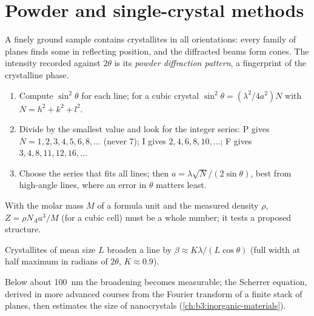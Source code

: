 \section{Powder and single-crystal methods}

\begin{definition}\label{def:b3:x-ray-diffraction:powder}
A finely ground sample contains crystallites in all orientations: every
family of planes finds some in reflecting position, and the diffracted beams
form cones. The intensity recorded against $2\theta$ is its \emph{powder
diffraction pattern}, a fingerprint of the
crystalline phase.
\end{definition}

\begin{method}\label{met:b3:x-ray-diffraction:index-cubic}
\begin{enumerate}
  \item Compute $\sin^2\theta$ for each line; for a cubic crystal $\sin^2\theta =
        (\lambda^2/4a^2)N$ with $N = h^2 + k^2 + l^2$.
  \item Divide by the smallest value and look for the integer series: P gives
        $N = 1, 2, 3, 4, 5, 6, 8, \dots$ (never 7); I gives $2, 4, 6, 8, 10, \dots$; F gives
        $3, 4, 8, 11, 12, 16, \dots$
  \item Choose the series that fits all lines; then $a = \lambda\sqrt N/(2\sin\theta)$, best
        from high-angle lines, where an error in $\theta$ matters least.
\end{enumerate}
\end{method}

\begin{method}\label{met:b3:x-ray-diffraction:z-from-density}
With the molar mass $M$ of a formula unit and the measured density $\rho$, $Z =
\rho N_Aa^3/M$ (for a cubic cell) must be a whole number; it tests a proposed
structure.
\end{method}

\begin{proposition}\label{prop:b3:x-ray-diffraction:scherrer}
Crystallites of mean size $L$ broaden a line by $\beta \approx K\lambda/(L\cos\theta)$ (full
width at half maximum in radians of $2\theta$, $K \approx 0.9$).
\end{proposition}
\admitted

Below about \qty{100}{nm} the broadening becomes measurable; the Scherrer
equation, derived in more advanced courses from the Fourier transform of a
finite stack of planes, then estimates the size of nanocrystals
(\cref{ch:b3:inorganic-materials}).

